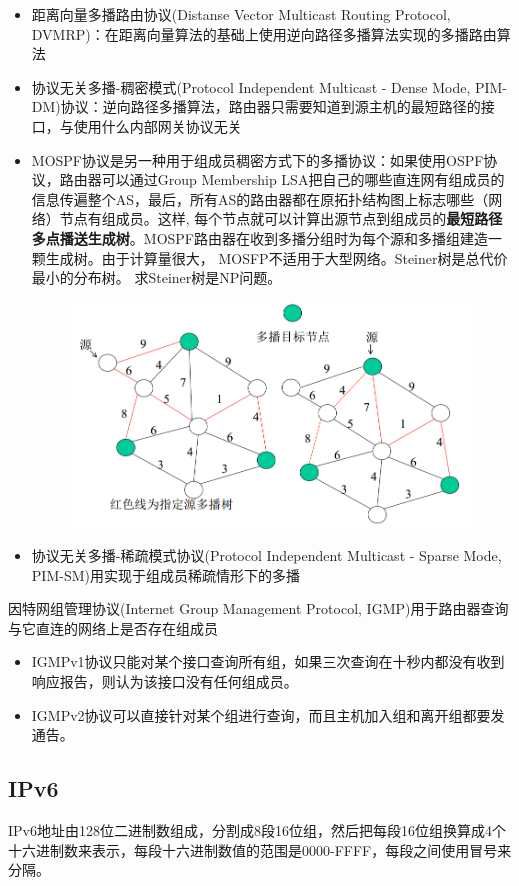 \begin{itemize}
	\item 距离向量多播路由协议(Distanse	Vector Multicast Routing Protocol, DVMRP)：在距离向量算法的基础上使用逆向路径多播算法实现的多播路由算法
	\item 协议无关多播-稠密模式(Protocol Independent Multicast - Dense Mode, PIM-DM)协议：逆向路径多播算法，路由器只需要知道到源主机的最短路径的接口，与使用什么内部网关协议无关
	\item MOSPF协议是另一种用于组成员稠密方式下的多播协议：如果使用OSPF协议，路由器可以通过Group Membership LSA把自己的哪些直连网有组成员的信息传遍整个AS，最后，所有AS的路由器都在原拓扑结构图上标志哪些（网络）节点有组成员。这样, 每个节点就可以计算出源节点到组成员的\textbf{最短路径多点播送生成树}。MOSPF路由器在收到多播分组时为每个源和多播组建造一颗生成树。由于计算量很大， MOSFP不适用于大型网络。Steiner树是总代价最小的分布树。 求Steiner树是NP问题。
	\begin{figure}[H]
		\centering
		\includegraphics[width=0.6\linewidth]{fig/MOSPF.png}
	\end{figure}
	\item 协议无关多播-稀疏模式协议(Protocol Independent Multicast - Sparse Mode, PIM-SM)用实现于组成员稀疏情形下的多播
\end{itemize}

因特网组管理协议(Internet Group Management Protocol, IGMP)用于路由器查询与它直连的网络上是否存在组成员
\begin{itemize}
	\item IGMPv1协议只能对某个接口查询所有组，如果三次查询在十秒内都没有收到响应报告，则认为该接口没有任何组成员。
	\item IGMPv2协议可以直接针对某个组进行查询，而且主机加入组和离开组都要发通告。
\end{itemize}

\subsection{IPv6}
IPv6地址由128位二进制数组成，分割成8段16位组，然后把每段16位组换算成4个十六进制数来表示，每段十六进制数值的范围是0000-FFFF，每段之间使用冒号来分隔。

